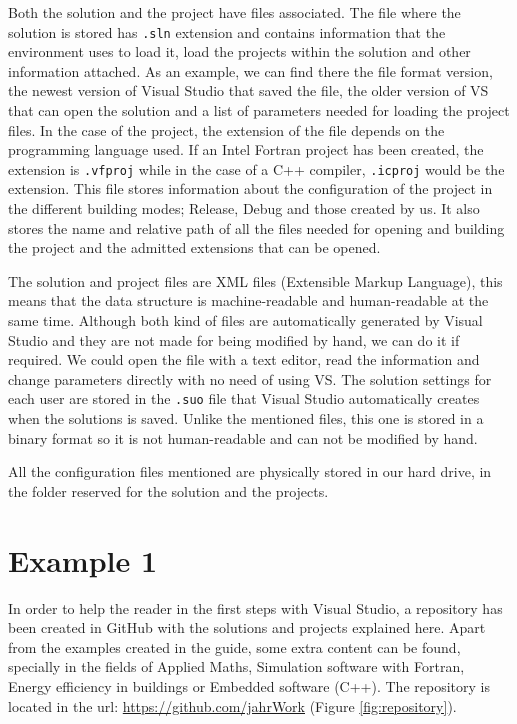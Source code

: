 Both the solution and the project have files associated. The file where the solution is stored has \texttt{.sln} extension and contains information that the environment uses to load it, load the projects within the solution and other information attached. As an example, we can find there the file format version, the newest version of Visual Studio that saved the file, the older version of VS that can open the solution and a list of parameters needed for loading the project files. In the case of the project, the extension of the file depends on the programming language used. If an Intel Fortran project has been created, the extension is \texttt{.vfproj} while in the case of a C++ compiler, \texttt{.icproj} would be the extension. This file stores information about the configuration of the project in the different building modes; Release, Debug and those created by us. It also stores the name and relative path of all the files needed for opening and building the project and the admitted extensions that can be opened. 

The solution and project files are XML files (Extensible Markup Language), this means that the data structure is machine-readable and human-readable at the same time. Although both kind of files are automatically generated by Visual Studio and they are not made for being modified by hand, we can do it if required. We could open the file with a text editor, read the information and change parameters directly with no need of using VS. The solution settings for each user are stored in the \texttt{.suo} file that Visual Studio automatically creates when the solutions is saved. Unlike the mentioned files, this one is stored in a binary format so it is not human-readable and can not be modified by hand. 

All the configuration files mentioned are physically stored in our hard drive, in the folder reserved for the solution and the projects.




\FloatBarrier
\section{Example 1} \label{sec:Ex2}

In order to help the reader in the first steps with Visual Studio, a repository has been created in GitHub with the solutions and projects explained here. Apart from the examples created in the guide, some extra content can be found, specially in the fields of Applied Maths, Simulation software with Fortran, Energy efficiency in buildings or Embedded software (C++). The repository is located in the url: \url{https://github.com/jahrWork} (Figure \ref{fig:repository}).

